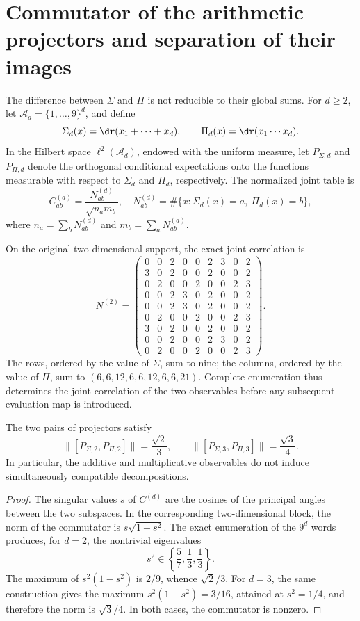 \section{Commutator of the arithmetic projectors and separation of their images}

The difference between \(\Sigma\) and \(\Pi\) is not reducible to their global sums.
For \(d\ge2\), let \(\mathscr A_d=\{1,\ldots,9\}^d\), and define
\[
 \Sigma_d(x)=\dr(x_1+\cdots+x_d),\qquad
 \Pi_d(x)=\dr(x_1\cdots x_d).
\]
In the Hilbert space \(\ell^2(\mathscr A_d)\), endowed with the
uniform measure, let \(P_{\Sigma,d}\) and \(P_{\Pi,d}\) denote the orthogonal
conditional expectations onto the functions measurable with respect to
\(\Sigma_d\) and \(\Pi_d\), respectively. The normalized joint table is
\[
 C^{(d)}_{ab}
 =\frac{N^{(d)}_{ab}}{\sqrt{n_a m_b}},
\quad
 N^{(d)}_{ab}
 =\#\{x:\Sigma_d(x)=a,\ \Pi_d(x)=b\},
\]
where \(n_a=\sum_bN^{(d)}_{ab}\) and
\(m_b=\sum_aN^{(d)}_{ab}\).

On the original two-dimensional support, the exact joint correlation is
\[
N^{(2)}=
\begin{pmatrix}
0&0&2&0&0&2&3&0&2\\
3&0&2&0&0&2&0&0&2\\
0&2&0&0&2&0&0&2&3\\
0&0&2&3&0&2&0&0&2\\
0&0&2&3&0&2&0&0&2\\
0&2&0&0&2&0&0&2&3\\
3&0&2&0&0&2&0&0&2\\
0&0&2&0&0&2&3&0&2\\
0&2&0&0&2&0&0&2&3
\end{pmatrix}.
\]
The rows, ordered by the value of \(\Sigma\), sum to nine; the columns,
ordered by the value of \(\Pi\), sum to \((6,6,12,6,6,12,6,6,21)\). Complete
enumeration thus determines the joint correlation of the two observables
before any subsequent evaluation map is introduced.

\begin{proposition}
\label{prop:app-no-conmutatividad}
The two pairs of projectors satisfy
\[
 \|[P_{\Sigma,2},P_{\Pi,2}]\|=\frac{\sqrt2}{3},
 \qquad
 \|[P_{\Sigma,3},P_{\Pi,3}]\|=\frac{\sqrt3}{4}.
\]
In particular, the additive and multiplicative observables do not induce simultaneously compatible decompositions.
\end{proposition}

\begin{proof}
The singular values \(s\) of \(C^{(d)}\) are the cosines of the principal angles
between the two subspaces. In the corresponding two-dimensional
block, the norm of the commutator is \(s\sqrt{1-s^2}\). The exact
enumeration of the \(9^d\) words produces, for \(d=2\), the nontrivial eigenvalues
\[
 s^2\in\left\{\frac57,\frac13,\frac13\right\}.
\]
The maximum of \(s^2(1-s^2)\) is \(2/9\), whence
\(\sqrt2/3\). For \(d=3\), the same construction gives the maximum
\(s^2(1-s^2)=3/16\), attained at \(s^2=1/4\), and therefore the norm is
\(\sqrt3/4\). In both cases, the commutator is nonzero.
\end{proof}

